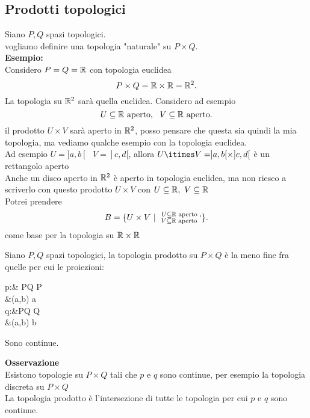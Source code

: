\documentclass{article}
\begin{document}
	 \subsection{Prodotti topologici}
	 Siano $P,Q$ spazi topologici.\\
	 vogliamo definire una topologia "naturale" su $P\times Q$.\\
	  \textbf{Esempio:}\\
Considero $P = Q = \mathbb{R}$ con topologia euclidea
 \[
 P\times Q = \mathbb{R}\times \mathbb{R} = \mathbb{R}^2
.\] 
La topologia su $\mathbb{R}^2$ sarà quella euclidea. Considero ad esempio
\[
	U \subseteq \mathbb{R}\text{ aperto}, \ \ V\subseteq\mathbb{R}\text{ aperto}
.\] 
il prodotto $U\times V$ sarà aperto in  $\mathbb{R}^2$, posso pensare che questa sia quindi la mia topologia, ma vediamo qualche esempio con la topologia euclidea.\\
Ad esempio  $U = ]a,b[ \ \ \ V = ]c,d[$, allora  $U\itimes V = ]a,b[\times]c,d[$ è un rettangolo aperto\\
Anche un disco aperto in  $\mathbb{R}^2$ è aperto in topologia euclidea, ma non riesco a scriverlo con questo prodotto  $U\times V$ con $U\subseteq \mathbb{R}, \ V\subseteq \mathbb{R}$\\
Potrei prendere
 \[
	 B = \{U\times V \ | \ \ \substack{U\subseteq \R \text{ aperto },\\ \hspace{-3px}V\subseteq\R\text{ aperto }}\}
.\] 
come base per la topologia su $\mathbb{R}\times\mathbb{R}$
 \begin{defi}
	Siano $P,Q$ spazi topologici, la topologia prodotto su $P\times Q$ è la meno fine fra quelle per cui le proiezioni:
	\begin{center}
		\begin{aligned}
			p:& P\times Q \rightarrow P\\
			  &(a,b) \rightarrow a\\
			q:&P\times Q \rightarrow Q\\
			  &(a,b) \rightarrow b
		\end{aligned}
	\end{center}
	Sono continue.
\end{defi}
\textbf{Osservazione}\\
Esistono topologie su $P\times Q$ tali che  $p$ e $q$ sono continue, per esempio la topologia discreta su $P\times Q$\\
La topologia prodotto è l'intersezione di tutte le topologia per cui  $p$ e $q$ sono continue.
\begin{teo}
	
\end{teo}

\end{document}

